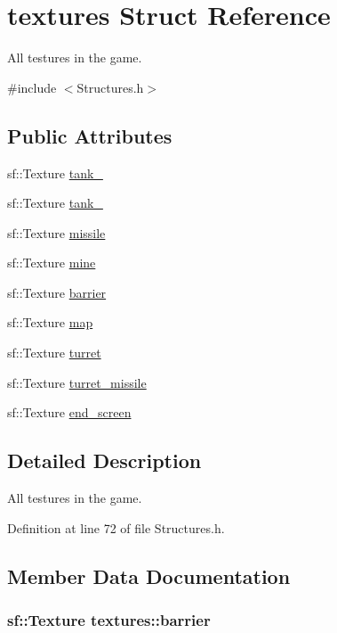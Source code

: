 \hypertarget{structtextures}{\section{textures Struct Reference}
\label{structtextures}
}


All testures in the game.  




{\ttfamily \#include $<$Structures.\-h$>$}

\subsection*{Public Attributes}
\begin{DoxyCompactItemize}
\item 
sf\-::\-Texture \hyperlink{structtextures_a9287e247a5d108ed875b7b5b89ded524}{tank\-\_}
\item 
sf\-::\-Texture \hyperlink{structtextures_a3322b3f064640afe1a4ebdb53636b71d}{tank\-\_}
\item 
sf\-::\-Texture \hyperlink{structtextures_a1d12557e92da80a9809f037edfe72f2f}{missile}
\item 
sf\-::\-Texture \hyperlink{structtextures_a7f5b6643fd47d1bd8d5758c24c32dc9e}{mine}
\item 
sf\-::\-Texture \hyperlink{structtextures_a36f35bd26858ecc8eb507e1072bfad7d}{barrier}
\item 
sf\-::\-Texture \hyperlink{structtextures_a703e4f064d67c1cee84ba8560a6104c6}{map}
\item 
sf\-::\-Texture \hyperlink{structtextures_a8454a0f97657e68ca0076f19c4de6236}{turret}
\item 
sf\-::\-Texture \hyperlink{structtextures_aa9ff61d80b32b3520308d8df61a8ea3f}{turret\-\_\-missile}
\item 
sf\-::\-Texture \hyperlink{structtextures_a6cb62efe7a4e59ebdc681261f22b8cae}{end\-\_\-screen}
\end{DoxyCompactItemize}


\subsection{Detailed Description}
All testures in the game. 

Definition at line 72 of file Structures.\-h.



\subsection{Member Data Documentation}
\hypertarget{structtextures_a36f35bd26858ecc8eb507e1072bfad7d}{
\subsubsection[{barrier}]{\setlength{\rightskip}{0pt plus 5cm}sf\-::\-Texture textures\-::barrier}}\label{structtextures_a36f35bd26858ecc8eb507e1072bfad7d}


